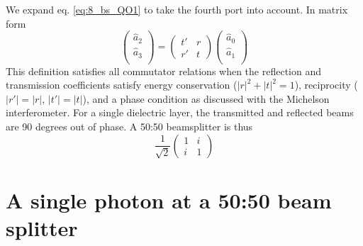 We expand eq.  \ref{eq:8_bs_QO1} to take the fourth port into account. In matrix form
\begin{equation}
    \begin{pmatrix}
        \hat{a}_2 \\ \hat{a}_3 \\
    \end{pmatrix}
    = 
    \begin{pmatrix}
       t' & r \\ r' & t
    \end{pmatrix}
    \begin{pmatrix}
        \hat{a}_0 \\ \hat{a}_1 \\
    \end{pmatrix}
\end{equation}
This definition satisfies all commutator relations when the reflection and transmission coefficients satisfy energy conservation ($|r|^2+ |t|^2 = 1$), reciprocity ($|r'| = |r|$, $|t'| = |t|$), and a phase condition as discussed with the Michelson interferometer. For a single dielectric layer, the transmitted and reflected beams are 90 degrees out of phase. A 50:50 beamsplitter is thus
\begin{equation}
\frac{1}{\sqrt{2}}
    \begin{pmatrix}
       1 & i \\ i & 1
    \end{pmatrix}
\end{equation}


\section{A single photon at a 50:50 beam splitter}

